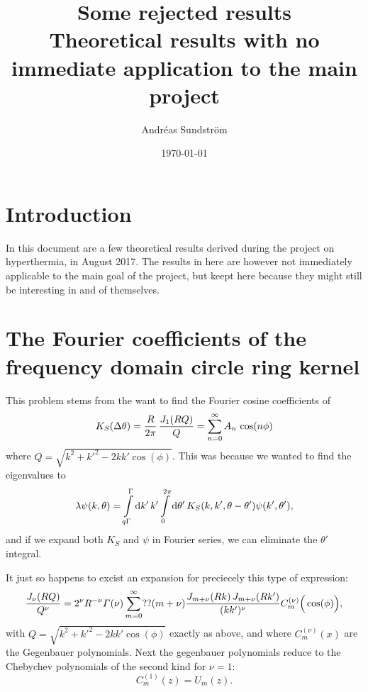 \documentclass[11pt,a4paper, 
swedish, english %
]{article}
\begin{document}
\title{Some rejected results\\
{\Large Theoretical results with no immediate application to the main project}}
\author{Andréas Sundström}
\date{\today}

\maketitle

\section*{Introduction}
In this document are a few theoretical results derived during the
project on hyperthermia, in August 2017. The results in here are
however not immediately applicable to the main goal of the project, but
keept here because they might still be interesting in and of
themselves. 



\section{The Fourier coefficients of the frequency domain 
circle ring kernel}
This problem stems from the want to find the Fourier
cosine\footnotemark{} coefficients of  
\begin{equation}
K_S(\Delta\theta) = \frac{R}{2\pi}\,\frac{J_1\qty(RQ)}{Q}
=\sum_{n=0}^\infty A_{n} \, \cos(n\phi)
\end{equation}
where $Q=\sqrt{k^2+{k'}^2-2kk'\cos(\phi)}$. 
This was because we wanted to find the eigenvalues to 
\begin{equation}\label{eq:eigint-pol}
\lambda\psi(k, \theta) =
\int_{q\Gamma}^\Gamma\rd{k'}\,k'
\int_{0}^{2\pi}\rd\theta'\,K_S(k, k', \theta-\theta') \psi(k',\theta'),
\end{equation}
and if we expand both $K_S$ and $\psi$ in Fourier series, we can
eliminate the $\theta'$ integral.

It just so happens to excist an expansion 
\cite[formula 8.532.1]{Gradshteyn-Ryzhik} for preciecely this type of
expression:
\begin{equation}
\frac{J_\nu\qty(RQ)}{Q^\nu} 
= 2^\nu R^{-\nu} \varGamma(\nu) \sum_{m=0}^\infty ?? (m+\nu) 
\frac{J_{m+\nu}(Rk)\,J_{m+\nu}(Rk')}{(kk')^\nu} 
C_m^{(\nu)}\Big(\cos(\phi)\Big),
\end{equation}
with $Q=\sqrt{k^2+{k'}^2-2kk'\cos(\phi)}$ exactly as above,
and where $C_m^{(\nu)}(x)$ are the Gegenbauer polynomials. Next the
gegenbauer polynomials reduce to the Chebychev polynomials of the
second kind for $\nu=1$: \cite[chapter 18.4]{Arfken-Weber}  
\begin{equation}
C_m^{(1)}(z) = U_m(z).
\end{equation}
\end{document}
